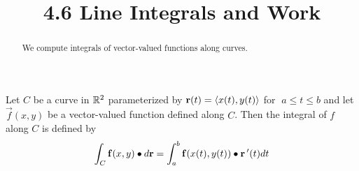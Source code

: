 \documentclass[handout]{ximera}
\title{4.6 Line Integrals and Work}
\begin{document}
\begin{abstract}
We compute integrals of vector-valued functions along curves.
\end{abstract}

\maketitle


\begin{definition}
Let $C$ be a curve in $\mathbb R^2$ parameterized by $\mathbf r(t) = \left\langle x(t), y(t)\right\rangle$ for $ \; a\leq t \leq b$ and let $\vec f(x, y)$ be a vector-valued function defined along $C$.
Then the integral of $f$ along $C$ is defined by
\[
\int_C \mathbf f(x, y) \bullet d\mathbf r = \int_a^b \mathbf f(x(t), y(t)) \bullet \mathbf r\,'(t) dt
\]
\end{definition}
 
\end{document}
